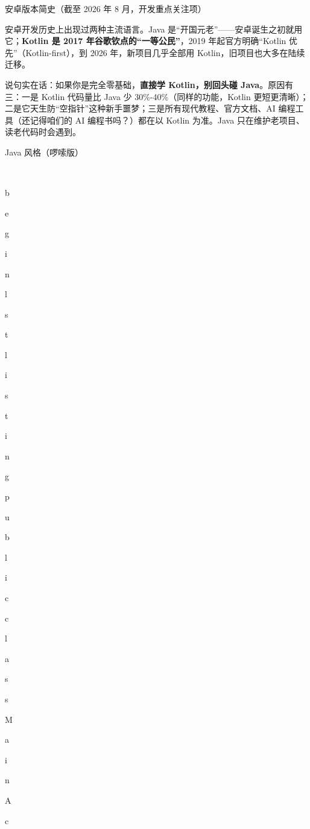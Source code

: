 \begin{center}\small\color{gray}安卓版本简史（截至 2026 年 8 月，开发重点关注项）\end{center}


安卓开发历史上出现过两种主流语言。Java 是“开国元老”——安卓诞生之初就用它；\textbf{Kotlin 是 2017 年谷歌钦点的“一等公民”}，2019 年起官方明确“Kotlin 优先”（Kotlin-first），到 2026 年，新项目几乎全部用 Kotlin，旧项目也大多在陆续迁移。

说句实在话：如果你是完全零基础，\textbf{直接学 Kotlin，别回头碰 Java}。原因有三：一是 Kotlin 代码量比 Java 少 30\%-40\%（同样的功能，Kotlin 更短更清晰）；二是它天生防“空指针”这种新手噩梦；三是所有现代教程、官方文档、AI 编程工具（还记得咱们的 AI 编程书吗？）都在以 Kotlin 为准。Java 只在维护老项目、读老代码时会遇到。

Java 风格（啰嗦版）

\

b

e

g

i

n

{

l

s

t

l

i

s

t

i

n

g

}




p

u

b

l

i

c

 

c

l

a

s

s

 

M

a

i

n

A

c

